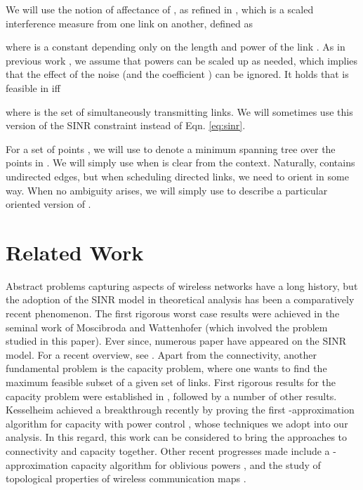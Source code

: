 \documentclass[11pt]{amsart}
\begin{document}
We will use the notion of affectance of \cite{HW09}, as refined in \cite{KV10}, 
which is a scaled interference measure from one link on another, defined as 
   
where  is a constant
depending only on the length and power of the link . 
As in previous work \cite{MoWa06,moscibroda06b,Moscibroda07,KesselheimSoda11}, we assume that
powers can be scaled up as needed, which implies that the effect of the noise  (and the coefficient ) can be ignored.
It holds that  is feasible in  iff

where  is the set of simultaneously transmitting links. We will
sometimes use this version of the SINR constraint instead of Eqn. \ref{eq:sinr}.


For a set of points , we will use  to denote a minimum spanning tree over the points in .
We will simply use  when  is clear from the context. Naturally,  contains undirected edges,
but when scheduling directed links, we need to orient  in some way. When no ambiguity
arises, we will simply use  to describe a particular oriented version of .


\section{Related Work}
\label{sec:related}
Abstract problems capturing aspects of wireless networks have a long history, but the adoption of the SINR
model in theoretical analysis has been a comparatively recent phenomenon. The first rigorous worst case
results were achieved in the seminal work of Moscibroda and
Wattenhofer \cite{MoWa06} (which involved the problem studied in this paper). Ever since, numerous paper
have appeared on the SINR model. For a recent overview, see 
\cite{GoussevskaiaPW10}. Apart
from the connectivity, another fundamental problem is the capacity problem, where one wants to find
the maximum feasible subset of a given set of links. First rigorous results for the capacity problem 
were established in \cite{GHWW09}, followed
by a number of other results.
Kesselheim achieved a breakthrough recently by proving the first -approximation algorithm for capacity
with power control \cite{KesselheimSoda11}, whose techniques we adopt into our analysis. In this regard,
this work can be considered to bring the approaches to connectivity and capacity together. Other recent progresses
made include a -approximation capacity algorithm for oblivious powers \cite{SODA11}, and the study of topological properties of wireless communication maps \cite{stoc_topology11}.
\end{document}
